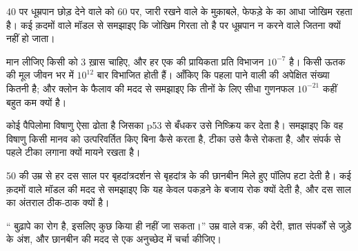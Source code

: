 \begin{exercise}[$\star\star$]\label{exo:g11:cancer:11}
40 पर धूम्रपान छोड़ देने वाले को 60 पर, जारी रखने वाले के मुक़ाबले,
फेफड़े के  का आधा जोखिम रहता है। कई क़दमों वाले मॉडल से समझाइए कि
जोखिम गिरता तो है पर धूम्रपान न करने वाले जितना क्यों नहीं हो जाता।
\end{exercise}

\begin{exercise}[$\star\star\star$]\label{exo:g11:cancer:12}
मान लीजिए किसी  को 3 ख़ास  चाहिए, और हर एक की प्रायिकता
प्रति  विभाजन $10^{-7}$ है। किसी ऊतक की मूल  जीवन भर में
$10^{12}$ बार विभाजित होती हैं। आँकिए कि पहला  पाने वाली
 की अपेक्षित संख्या कितनी है; और क्लोन के फैलाव की मदद से समझाइए
कि तीनों के लिए सीधा गुणनफल $10^{-21}$ कहीं बहुत कम क्यों है।
\end{exercise}

\begin{exercise}[$\star\star\star$]\label{exo:g11:cancer:13}
कोई पैपिलोमा विषाणु ऐसा  ढोता है जिसका  p53 से बँधकर उसे
निष्क्रिय कर देता है। समझाइए कि वह विषाणु किसी मानव  को उत्परिवर्तित
किए बिना  कैसे करता है, टीका उसे कैसे रोकता है, और संपर्क से पहले
टीका लगाना क्यों मायने रखता है।
\end{exercise}

\begin{exercise}[$\star\star\star$]\label{exo:g11:cancer:14}
50 की उम्र से हर दस साल पर बृहदांत्रदर्शन से बृहदांत्र के  की छानबीन
मिले हुए पॉलिप हटा देती है। कई क़दमों वाले मॉडल की मदद से समझाइए कि यह केवल
पकड़ने के बजाय  रोक क्यों देती है, और दस साल का अंतराल ठीक-ठाक क्यों
है।
\end{exercise}

\begin{exercise}[$\star\star\star$]\label{exo:g11:cancer:15}
`` बुढ़ापे का रोग है, इसलिए कुछ किया ही नहीं जा सकता।'' उम्र वाले
वक्र,  की देरी, ज्ञात संपर्कों से जुड़े  के अंश, और छानबीन
की मदद से एक अनुच्छेद में चर्चा कीजिए।
\end{exercise}

